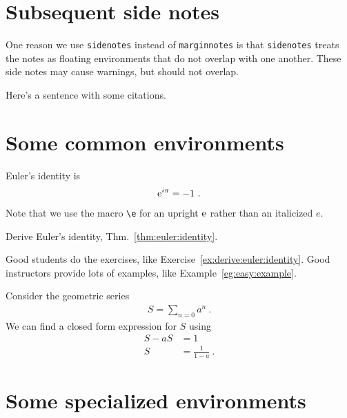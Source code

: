 \section{Subsequent side notes}

One reason we use \texttt{sidenotes} instead of \texttt{marginnotes} is that \texttt{sidenotes} treats the notes as floating environments that do not overlap with one another. These side notes may cause warnings, but should not overlap.

Here's a sentence with some citations.



\section{Some common environments}

\begin{theorem}
\label{thm:euler:identity}
    Euler's identity is
    \begin{align}
        \operatorname{e}^{i\pi} = -1 \ .
    \end{align}
    Note that we use the macro \verb!\e! for an upright $\operatorname{e}$ rather than an italicized $e$.
\end{theorem}

\begin{exercise}
\label{ex:derive:euler:identity}
    Derive Euler's identity, Thm.~\ref{thm:euler:identity}.
\end{exercise}

\noindent Good students do the exercises, like Exercise~\ref{ex:derive:euler:identity}. Good instructors provide lots of examples, like Example~\ref{eg:easy:example}.

\begin{example}
\label{eg:easy:example}
    Consider the geometric series
    \begin{align}
        S = \sum_{n=0} a^n \ .
    \end{align}
    We can find a closed form expression for $S$ using
    \begin{align}
        S - aS &= 1\\
        S &= \frac{1}{1-a} \ .
    \end{align}
\end{example}

\section{Some specialized environments}

